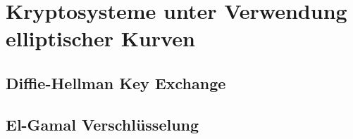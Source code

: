 \chapter{Kryptosysteme unter Verwendung elliptischer Kurven}
\section{Diffie-Hellman Key Exchange}
\section{El-Gamal Verschlüsselung}